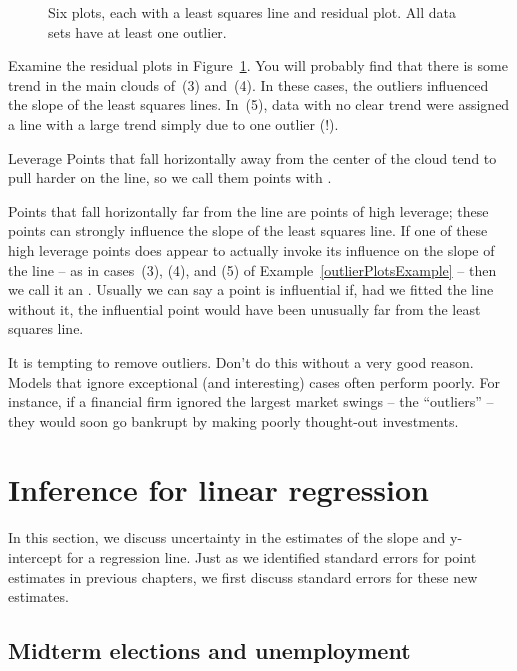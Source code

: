 \begin{figure}
  \centering
  \caption{Six plots, each with a least squares line and
      residual plot. All data sets have at least one outlier.}
\label{outlierPlots}
\end{figure}

Examine the residual plots in Figure~\ref{outlierPlots}.
You will probably find that there is some trend in the main
clouds of~(3) and~(4).
In these cases, the outliers influenced the slope of the
least squares lines.
In~(5), data with no clear trend were assigned a line with
a large trend simply due to one outlier (!).
 
\begin{onebox}{Leverage}
  Points that fall horizontally away from the center of the
  cloud tend to pull harder on the line, so we call them points
  with .
\end{onebox}

Points that fall horizontally far from the line are points
of high leverage;
these points can strongly influence the slope of the least
squares line.
If one of these high leverage points does appear to actually
invoke its influence on the slope of the line --
as in cases~(3), (4), and (5) of Example~\ref{outlierPlotsExample}
-- then we call it an .
Usually we can say a point is influential if, had we fitted
the line without it, the influential point would have been
unusually far from the least squares line.

It is tempting to remove outliers.
Don't do this without a very good reason.
Models that ignore exceptional (and interesting) cases often
perform poorly.
For instance, if a financial firm ignored the largest market
swings -- the ``outliers'' --  they would soon go bankrupt
by making poorly thought-out investments.




\section{Inference for linear regression}
\label{inferenceForLinearRegression}

In this section, we discuss uncertainty in the estimates
of the slope and y-intercept for a regression line.
Just as we identified standard errors for point estimates
in previous chapters, we first discuss standard errors for
these new estimates.


\subsection{Midterm elections and unemployment}

